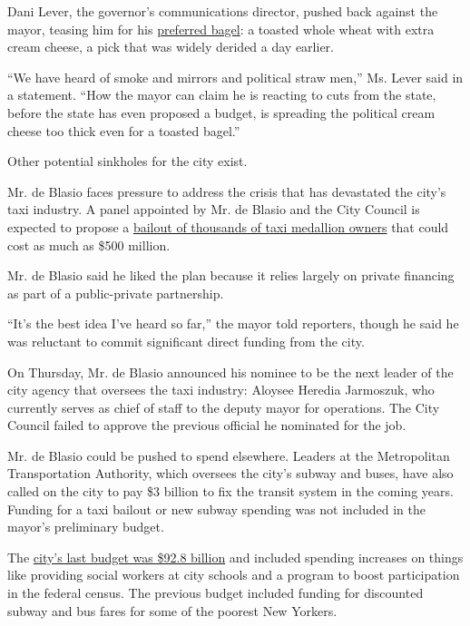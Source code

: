 Dani Lever, the governor's communications director, pushed back against
the mayor, teasing him for his
\href{https://www.nytimes3xbfgragh.onion/2020/01/15/nyregion/bagel-ny-toasted-de-blasio.html}{preferred
bagel}: a toasted whole wheat with extra cream cheese, a pick that was
widely derided a day earlier.

``We have heard of smoke and mirrors and political straw men,'' Ms.
Lever said in a statement. ``How the mayor can claim he is reacting to
cuts from the state, before the state has even proposed a budget, is
spreading the political cream cheese too thick even for a toasted
bagel.''

Other potential sinkholes for the city exist.

Mr. de Blasio faces pressure to address the crisis that has devastated
the city's taxi industry. A panel appointed by Mr. de Blasio and the
City Council is expected to propose a
\href{https://www.nytimes3xbfgragh.onion/2020/01/15/nyregion/nyc-taxi-medallion-bailout.html}{bailout
of thousands of taxi medallion owners} that could cost as much as \$500
million.

Mr. de Blasio said he liked the plan because it relies largely on
private financing as part of a public-private partnership.

``It's the best idea I've heard so far,'' the mayor told reporters,
though he said he was reluctant to commit significant direct funding
from the city.

On Thursday, Mr. de Blasio announced his nominee to be the next leader
of the city agency that oversees the taxi industry: Aloysee Heredia
Jarmoszuk, who currently serves as chief of staff to the deputy mayor
for operations. The City Council failed to approve the previous official
he nominated for the job.

Mr. de Blasio could be pushed to spend elsewhere. Leaders at the
Metropolitan Transportation Authority, which oversees the city's subway
and buses, have also called on the city to pay \$3 billion to fix the
transit system in the coming years. Funding for a taxi bailout or new
subway spending was not included in the mayor's preliminary budget.

The
\href{https://www.nytimes3xbfgragh.onion/2019/06/15/nyregion/nyc-budget-funding.html}{city's
last budget was \$92.8 billion} and included spending increases on
things like providing social workers at city schools and a program to
boost participation in the federal census. The previous budget included
funding for discounted subway and bus fares for some of the poorest New
Yorkers.

